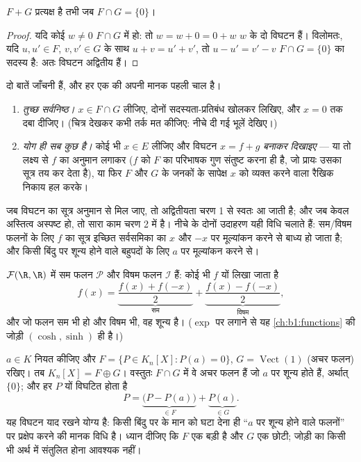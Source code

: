 \begin{proposition}\label{prop:b1:vspaces:directsum}
$F + G$ प्रत्यक्ष है तभी जब $F \cap G = \{0\}$।
\end{proposition}

\begin{proof}
यदि कोई $w \neq 0$ $F \cap G$ में हो: तो $w = w + 0 = 0 + w$ $w$ के दो विघटन
हैं। विलोमतः, यदि $u, u' \in F$, $v, v' \in G$ के साथ $u + v = u' + v'$, तो
$u - u' = v' - v$ $F \cap G = \{0\}$ का सदस्य है: अतः विघटन अद्वितीय हैं।
\end{proof}

\begin{method}[$E = F \oplus G$ सिद्ध करना]
\label{met:b1:vspaces:directsum}
दो बातें जाँचनी हैं, और हर एक की अपनी मानक पहली चाल है।
\begin{enumerate}
  \item \emph{तुच्छ सर्वनिष्ठ।} $x \in F \cap G$ लीजिए, दोनों
  सदस्यता-प्रतिबंध खोलकर लिखिए, और $x = 0$ तक दबा दीजिए। (चित्र देखकर कभी
  तर्क मत कीजिए: नीचे दी गई भूलें देखिए।)
  \item \emph{योग ही सब कुछ है।} कोई भी $x \in E$ लीजिए और विघटन $x = f + g$
  \emph{बनाकर दिखाइए} --- या तो लक्ष्य से $f$ का अनुमान लगाकर ($f$ को $F$ का
  परिभाषक गुण संतुष्ट करना ही है, जो प्रायः उसका सूत्र तय कर देता है), या
  फिर $F$ और $G$ के जनकों के सापेक्ष $x$ को व्यक्त करने वाला रैखिक निकाय हल
  करके।
\end{enumerate}
जब विघटन का सूत्र अनुमान से मिल जाए, तो अद्वितीयता चरण 1 से स्वतः आ जाती है;
और जब केवल अस्तित्व अस्पष्ट हो, तो सारा काम चरण 2 में है। नीचे के दोनों
उदाहरण यही विधि चलाते हैं: सम/विषम फलनों के लिए $f$ का सूत्र इच्छित
सर्वसमिका का $x$ और $-x$ पर मूल्यांकन करने से बाध्य हो जाता है; और किसी
बिंदु पर शून्य होने वाले बहुपदों के लिए $a$ पर मूल्यांकन करने से।
\end{method}

\begin{example}\label{ex:b1:vspaces:evenodd}
$\mathcal{F}(\R, \R)$ में सम फलन $\mathcal{P}$ और विषम फलन $\mathcal{I}$
 हैं: कोई भी $f$ यों लिखा जाता है
\[
f(x) = \underbrace{\frac{f(x) + f(-x)}{2}}_{\text{सम}}
+ \underbrace{\frac{f(x) - f(-x)}{2}}_{\text{विषम}},
\]
और जो फलन सम भी हो और विषम भी, वह शून्य है। ($\exp$ पर लगाने से यह
\cref{ch:b1:functions} की जोड़ी $(\cosh, \sinh)$ ही है।)
\end{example}

\begin{example}[{$K_n[X]$ में एक पूरक जोड़ी}]
\label{ex:b1:vspaces:hyperplane}
$a \in K$ नियत कीजिए और $F = \{P \in K_n[X] : P(a) = 0\}$, $G =
\operatorname{Vect}(1)$ (अचर फलन) रखिए। तब $K_n[X] = F \oplus G$। वस्तुतः $F
\cap G$ में वे अचर फलन हैं जो $a$ पर शून्य होते हैं, अर्थात् $\{0\}$; और हर
$P$ यों विघटित होता है
\[
P = \underbrace{\bigl(P - P(a)\bigr)}_{\in F}
+ \underbrace{P(a)}_{\in G} .
\]
यह विघटन याद रखने योग्य है: किसी बिंदु पर के मान को घटा देना ही ``$a$ पर
शून्य होने वाले फलनों'' पर प्रक्षेप करने की मानक विधि है। ध्यान दीजिए कि $F$
एक बड़ी  है और $G$ एक छोटी;  जोड़ी का किसी भी अर्थ में संतुलित
होना आवश्यक नहीं।
\end{example}

